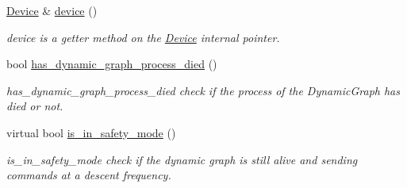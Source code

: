 \begin{DoxyCompactItemize}
\hyperlink{classdynamic__graph_1_1Device}{Device} \& \hyperlink{classdynamic__graph_1_1DynamicGraphManager_a90bb14375da3d2aaaeafb356b6ca54f7}{device} ()
\begin{DoxyCompactList}\small\item\em device is a getter method on the \hyperlink{classdynamic__graph_1_1Device}{Device} internal pointer. \end{DoxyCompactList}\item 
bool \hyperlink{classdynamic__graph_1_1DynamicGraphManager_ab980a2384c817ab5f59e712a54b2261a}{has\+\_\+dynamic\+\_\+graph\+\_\+process\+\_\+died} ()
\begin{DoxyCompactList}\small\item\em has\+\_\+dynamic\+\_\+graph\+\_\+process\+\_\+died check if the process of the Dynamic\+Graph has died or not. \end{DoxyCompactList}\item 
virtual bool \hyperlink{classdynamic__graph_1_1DynamicGraphManager_aea29e8dc351e0a50a8d2803d854d238d}{is\+\_\+in\+\_\+safety\+\_\+mode} ()
\begin{DoxyCompactList}\small\item\em is\+\_\+in\+\_\+safety\+\_\+mode check if the dynamic graph is still alive and sending commands at a descent frequency. \end{DoxyCompactList}\end{DoxyCompactItemize}
